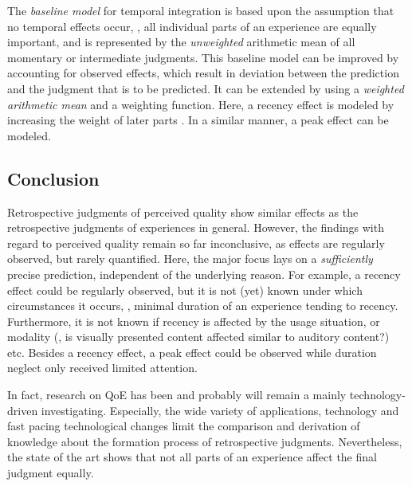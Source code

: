 The \emph{baseline model} for temporal integration is based upon the assumption that no temporal effects occur, \ie, all individual parts of an experience are equally important, and is represented by the \emph{unweighted} arithmetic mean of all momentary or intermediate judgments.
This baseline model can be improved by accounting for observed effects, which result in deviation between the prediction and the judgment that is to be predicted.
It can be extended by using a \emph{weighted arithmetic mean} and a weighting function.
Here, a recency effect is modeled by increasing the weight of later parts \citep[][]{rosenbluth_testing_1998, weiss_modeling_2009, hamberg_time-varying_1999}.
In a similar manner, a peak effect can be modeled.

\subsection{Conclusion}
Retrospective judgments of perceived quality show similar effects as the retrospective judgments of experiences in general.
However, the findings with regard to perceived quality remain so far inconclusive, as effects are regularly observed, but rarely quantified.
Here, the major focus lays on a \emph{sufficiently} precise prediction, independent of the underlying reason.
For example, a recency effect could be regularly observed, but it is not (yet) known under which circumstances it occurs, \eg, minimal duration of an experience tending to recency.
Furthermore, it is not known if recency is affected by the usage situation, or modality (\eg, is visually presented content affected similar to auditory content?) etc.
Besides a recency effect, a peak effect could be observed while duration neglect only received limited attention.

In fact, research on \ac{QoE} has been and probably will remain a mainly technology-driven investigating.
Especially, the wide variety of applications, technology and fast pacing technological changes limit the comparison and derivation of knowledge about the formation process of retrospective judgments.
Nevertheless, the state of the art shows that not all parts of an experience affect the final judgment equally.
